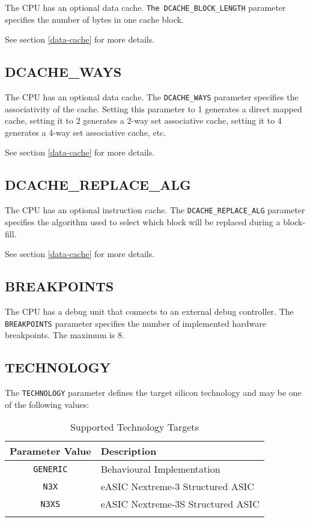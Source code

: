 The CPU has an optional data cache. \texttt{The DCACHE\_BLOCK\_LENGTH} parameter
specifies the number of bytes in one cache block.

See section \ref{data-cache}  for more details.

\subsection{DCACHE\_WAYS}\label{dcache_ways}

The CPU has an optional data cache. The \texttt{DCACHE\_WAYS} parameter specifies
the associativity of the cache. Setting this parameter to 1 generates a
direct mapped cache, setting it to 2 generates a 2-way set associative
cache, setting it to 4 generates a 4-way set associative cache, etc.

See section \ref{data-cache}  for more details.

\subsection{DCACHE\_REPLACE\_ALG}\label{dcache_replace_alg}

The CPU has an optional instruction cache. The \texttt{DCACHE\_REPLACE\_ALG}
parameter specifies the algorithm used to select which block will be
replaced during a block-fill.

See section \ref{data-cache}  for more details.

\subsection{BREAKPOINTS}\label{breakpoints}

The CPU has a debug unit that connects to an external debug controller.
The \texttt{BREAKPOINTS} parameter specifies the number of implemented hardware
breakpoints. The maximum is 8.

\subsection{TECHNOLOGY}\label{technology}

The \texttt{TECHNOLOGY} parameter defines the target silicon technology and may
be one of the following values:

\begin{longtable}[]{@{}cl@{}}
\toprule
Parameter Value & Description\tabularnewline
\midrule
\endhead
\texttt{GENERIC} & Behavioural Implementation\tabularnewline
\texttt{N3X} & eASIC Nextreme-3 Structured ASIC\tabularnewline
\texttt{N3XS} & eASIC Nextreme-3S Structured ASIC\tabularnewline
\bottomrule
\caption{Supported Technology Targets}
\label{tab:supported-tech-targets}

\end{longtable}

